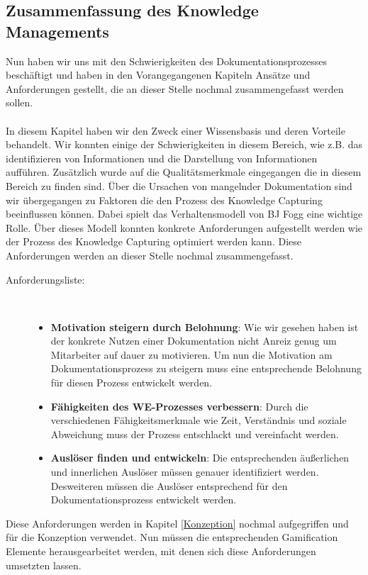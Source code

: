 \documentclass[a4paper,12pt]{scrartcl}
\begin{document}
\subsection{Zusammenfassung des Knowledge Managements}
\label{Zusammenfassung des Knowledge Managements}
Nun haben wir uns mit den Schwierigkeiten des Dokumentationsprozesses beschäftigt und haben in den Vorangegangenen Kapiteln Ansätze und Anforderungen gestellt, die an dieser Stelle nochmal zusammengefasst werden sollen.
\\\\
In diesem Kapitel haben wir den Zweck einer Wissensbasis und deren Vorteile behandelt. Wir konnten einige der Schwierigkeiten in diesem Bereich, wie z.B. das identifizieren von Informationen und die Darstellung von Informationen aufführen. Zusätzlich wurde auf die Qualitätsmerkmale eingegangen die in diesem Bereich zu finden sind. Über die Ursachen von mangelnder Dokumentation sind wir übergegangen zu Faktoren die den Prozess des Knowledge Capturing beeinflussen können. Dabei spielt das Verhaltensmodell von BJ Fogg eine wichtige Rolle. Über dieses Modell konnten konkrete Anforderungen aufgestellt werden wie der Prozess des Knowledge Capturing optimiert werden kann. Diese Anforderungen werden an dieser Stelle nochmal zusammengefasst.
\begin{description}
   \item[Anforderungsliste:]~\par
   \begin{itemize}
      \item \textbf{Motivation steigern durch Belohnung}: Wie wir gesehen haben ist der konkrete Nutzen einer Dokumentation nicht Anreiz genug um Mitarbeiter auf dauer zu motivieren. Um nun die Motivation am Dokumentationsprozess zu steigern muss eine entsprechende Belohnung für diesen Prozess entwickelt werden.
      \item \textbf{Fähigkeiten des WE-Prozesses verbessern}: Durch die verschiedenen Fähigkeitsmerkmale wie Zeit, Verständnis und soziale Abweichung muss der Prozess entschlackt und vereinfacht werden.
      \item \textbf{Auslöser finden und entwickeln}: Die entsprechenden äußerlichen und innerlichen Auslöser müssen genauer identifiziert werden. Desweiteren müssen die Auslöser entsprechend für den Dokumentationsprozess entwickelt werden.
   \end{itemize}
\end{description}
Diese Anforderungen werden in Kapitel \ref{Konzeption} nochmal aufgegriffen und für die Konzeption verwendet. Nun müssen die entsprechenden Gamification Elemente herausgearbeitet werden, mit denen sich diese Anforderungen umsetzten lassen.    
\newpage
\end{document}
